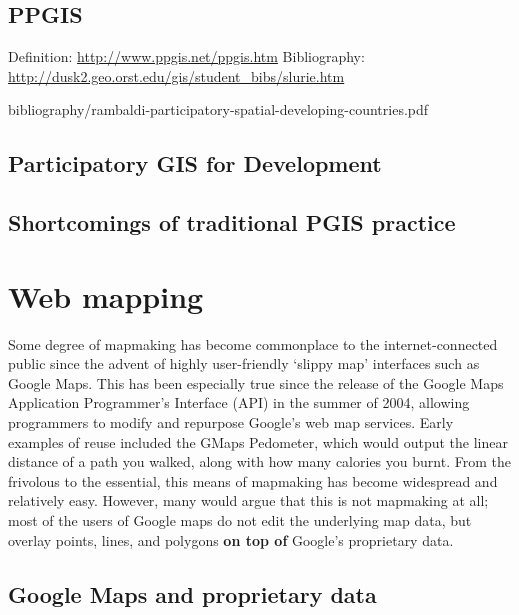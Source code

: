 \documentclass[11pt]{report}
\begin{document}
\subsection{PPGIS}

Definition: \url{http://www.ppgis.net/ppgis.htm}
Bibliography: \url{http://dusk2.geo.orst.edu/gis/student_bibs/slurie.htm}


bibliography/rambaldi-participatory-spatial-developing-countries.pdf

\subsection{Participatory GIS for Development}
\subsection{Shortcomings of traditional PGIS practice}

\section{Web mapping}

Some degree of mapmaking has become commonplace to the internet-connected public since the advent of highly user-friendly `slippy map' interfaces such as Google Maps. This has been especially true since the release of the Google Maps Application Programmer's Interface (API) in the summer of 2004, allowing programmers to modify and repurpose Google's web map services.  Early examples of reuse included the GMaps Pedometer, which would output the linear distance of a path you walked, along with how many calories you burnt. \cite{gibson2006google} From the frivolous to the essential, this means of mapmaking has become widespread and relatively easy. However, many would argue that this is not mapmaking at all; most of the users of Google maps do not edit the underlying map data, but overlay points, lines, and polygons \textbf{on top of} Google's proprietary data.

\subsection{Google Maps and proprietary data}
\end{document}
